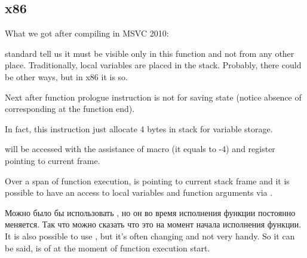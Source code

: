 ﻿\subsection{x86}

{What we got after compiling in MSVC 2010:}




{\CCpp standard tell us it must be visible only in this function and not from any other place. 
Traditionally, local variables are placed in the stack. 
Probably, there could be other ways, but in x86 it is so.}

{Next after function prologue instruction  is not for saving \ECX state 
(notice absence of corresponding  at the function end).}

{In fact, this instruction just allocate 4 bytes in stack for  variable storage.} 

{ will be accessed with the assistance of  macro 
(it equals to -4) and \EBP register pointing to current frame.}

{Over a span of function execution, \EBP is pointing to current stack frame and it is possible 
to have an access to local variables and function arguments via .}

\IFRU
{Можно было бы использовать \ESP, но он во время исполнения функции постоянно меняется. 
Так что можно сказать что \EBP это  \ESP на момент начала исполнения функции.}
{It is also possible to use \ESP, but it's often changing and not very handy.
So it can be said, \EBP is  of \ESP at the moment of function execution start.}

